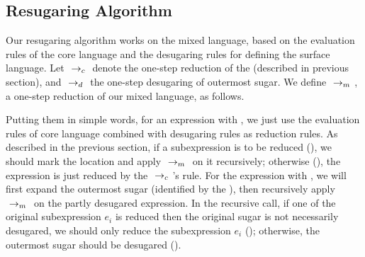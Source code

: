 \subsection{Resugaring Algorithm}

Our resugaring algorithm works on the mixed language, based on the evaluation rules of the core language and the desugaring rules for defining the surface language. Let $~\rightarrow_c~$ denote the one-step reduction of the  (described in previous section), and $~\rightarrow_d~$ the one-step desugaring of outermost sugar. We define $~\rightarrow_m~$, a one-step reduction of our mixed language, as follows.
\label{mark:mixedreduction}
{}
{}
{}
{
}

Putting them in simple words, for an expression with , we just use the evaluation rules of core language combined with desugaring rules as reduction rules. As described in the previous section, if a  subexpression is to be reduced (), we should mark the location and apply $~\rightarrow_m~$ on it recursively; otherwise (), the expression is just reduced by the $~\rightarrow_c~$'s rule.
For the expression with , we will first expand the outermost sugar (identified by the ), then recursively apply $~\rightarrow_m~$ on the partly desugared expression. In the recursive call, if one of the original subexpression $e_i$ is reduced then the original sugar is not necessarily desugared, we should only reduce the subexpression $e_i$ (); otherwise, the outermost sugar should be desugared ().


